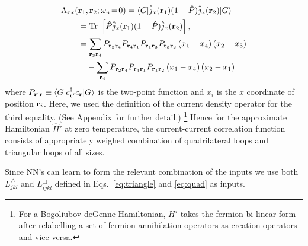 \documentclass[amsmath,amssymb, aps, prl, twocolumn]{revtex4-1}
\begin{document}
\begin{equation}
\left. \begin{aligned}
\Lambda_{xx}(&{\bf r}_1,{\bf r}_2;\omega_n\!=\!0)
= \langle G|\hat{j}_x({\bf r}_1)(1-\hat{P}) \hat{j}_x({\bf r}_2)|G\rangle \\
   &={\rm Tr}\ \left[\hat{P}\hat{j}_x({\bf r}_1)(1-\hat{P}) \hat{j}_x({\bf r}_2)\right],\\
&= \sum_{{\bf r}_3 {\bf r}_4}P_{{\bf r}_2 {\bf r}_4}P_{{\bf r}_4{\bf r}_1}P_{{\bf r}_1{\bf r}_3}P_{{\bf r}_3{\bf r}_2}\left(x_1-x_4\right)\left(x_2-x_3\right) \\
& \quad - \sum_{{\bf r}_4}P_{{\bf r}_2 {\bf r}_4}P_{{\bf r}_4{\bf r}_1}P_{{\bf r}_1{\bf r}_2}\left(x_1-x_4\right)\left(x_2-x_1\right)
\end{aligned}
\right.
\label{eq:j-j}
\end{equation}
where $P_{{\bf r}'{\bf r}}\equiv \langle G|c^\dagger_{{\bf r}'} c_{\bf r}|G\rangle $ is the two-point function and $x_i$ is the $x$ coordinate of position ${\bf r}_i$. Here, we used the definition of the current density operator for the third equality. (See Appendix for further detail.) \footnote{{\color{blue}For a Bogoliubov deGenne Hamiltonian, $H'$ takes the fermion bi-linear form after relabelling a set of fermion annihilation operators as creation operators and vice versa. }}
Hence for the approximate Hamiltonian $\hat{H}'$ at zero temperature, the current-current correlation function consists of appropriately weighed combination of quadrilateral loops and triangular loops of all sizes.


Since NN's can learn to form the relevant combination of the inputs we use both $L^\triangle_{jkl}$ and  $L^\Box_{ijkl}$ defined in Eqs.~\ref{eq:triangle} and \ref{eq:quad} as inputs. 
\end{document}
